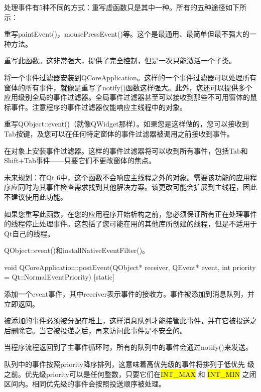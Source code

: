 处理事件有5种不同的方式：重写虚函数只是其中一种。所有的五种途径如下所
示：

\begin{compactenum}
\item 重写paintEvent()，mousePressEvent()等。这个是最通用、最简单但最不强大的一种方法。
\item 重写此函数。这非常强大，提供了完全控制，但是一次只能激活一个子类。
\item 将一个事件过滤器安装到QCoreApplication。这样的一个事件过滤器可以处理所有窗体的所有事件，就像是重写了notify()函数这样强大。此外，您还可以提供多个应用级别全局的事件过滤器。全局事件过滤器甚至可以接收到那些不可用窗体的鼠标事件。注意程序的事件过滤器仅能响应主线程中的对象。
\item 重写QObject::event()（就像QWidget那样）。如果您是这样做的，您可以接收到Tab按键，及您可以在任何特定窗体的事件过滤器被调用之前接收到事件。
\item 在对象上安装事件过滤器。这样的事件过滤器将可以收到所有事件，包括Tab和Shift+Tab事件——只要它们不更改窗体的焦点。
\end{compactenum}


未来规划：在Qt 6中，这个函数不会响应主线程之外的对象。需要该功能的应用程序应同时为其事件检查需求找到其他解决方案。该更改可能会扩展到主线程，因此不建议使用此功能。

\begin{notice}
如果您重写此函数，在您的应用程序开始析构之前，您必须保证所有正在处理事件的线程停止处理事件。这包括了您可能在用的其他库所创建的线程，但是不适用于Qt自己的线程。
\end{notice}

\begin{seeAlso}
QObject::event()和installNativeEventFilter()。
\end{seeAlso}

void QCoreApplication::postEvent(QObject* receiver, QEvent* event, int priority = Qt::NormalEventPriority) [static]

添加一个event事件，其中receiver表示事件的接收方。事件被添加到消息队列，并立即返回。

被添加的事件必须被分配在堆上，这样消息队列才能接管此事件，并在它被投送之后删除它。当它被投递之后，再来访问此事件是不安全的。

当程序流程返回到了主事件循环时，所有的队列中的事件会通过notify()来发送。

队列中的事件按照priority降序排列，这意味着高优先级的事件将排列于低优先
级之前。优先级priority可以是任何整数，只要它们在\hl{INT\_MAX} 和
\hl{INT\_MIN} 之闭区间内。相同优先级的事件会按照投送顺序被处理。


